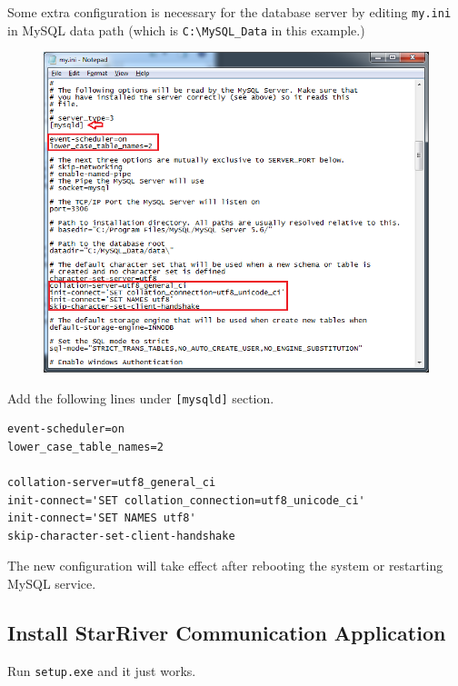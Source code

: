Some extra configuration is necessary for the database server by editing
\texttt{my.ini} in MySQL data path (which is
\texttt{C:\textbackslash{}MySQL\_Data} in this example.)

\begin{figure}[htbp]
\centering
\includegraphics{img/my_ini.png}
\end{figure}

Add the following lines under \texttt{{[}mysqld{]}} section.

\begin{verbatim}
event-scheduler=on
lower_case_table_names=2

collation-server=utf8_general_ci
init-connect='SET collation_connection=utf8_unicode_ci'
init-connect='SET NAMES utf8'
skip-character-set-client-handshake
\end{verbatim}

The new configuration will take effect after rebooting the system or
restarting MySQL service.

\subsection{Install StarRiver Communication
Application}\label{install-starriver-communication-application}

Run \texttt{setup.exe} and it just works.

